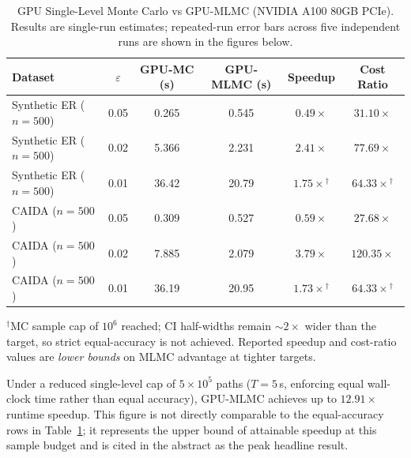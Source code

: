 \documentclass[pdflatex,sn-mathphys-num]{sn-jnl}
\theoremstyle{thmstyleone}%
\theoremstyle{thmstyletwo}%
\theoremstyle{thmstylethree}%
\begin{document}
\begin{table}[t]
\caption{GPU Single-Level Monte Carlo vs GPU-MLMC (NVIDIA A100 80GB PCIe). Results are
single-run estimates; repeated-run error bars across five independent runs are shown in the figures below.}
\label{tab:gpu_gpu_a100}
\centering\small
\begin{tabular*}{\linewidth}{@{\extracolsep\fill}l c c c c c@{}}
\toprule
Dataset & $\varepsilon$ & GPU-MC (s) & GPU-MLMC (s) & Speedup & Cost Ratio \\
\midrule
Synthetic ER ($n=500$) & 0.05 & 0.265 & 0.545 & $0.49\times$ & $31.10\times$ \\
Synthetic ER ($n=500$) & 0.02 & 5.366 & 2.231 & $2.41\times$ & $77.69\times$ \\
Synthetic ER ($n=500$) & 0.01 & 36.42 & 20.79 & $1.75\times$$^\dagger$ & $64.33\times$$^\dagger$ \\
CAIDA ($n=500$) & 0.05 & 0.309 & 0.527 & $0.59\times$ & $27.68\times$ \\
CAIDA ($n=500$) & 0.02 & 7.885 & 2.079 & $3.79\times$ & $120.35\times$ \\
CAIDA ($n=500$) & 0.01 & 36.19 & 20.95 & $1.73\times$$^\dagger$ & $64.33\times$$^\dagger$ \\
\bottomrule
\end{tabular*}
\vspace{2pt}
\footnotesize$^\dagger$MC sample cap of $10^6$ reached; CI half-widths remain ${\sim}2\times$
wider than the target, so strict equal-accuracy is not achieved. Reported speedup and cost-ratio
values are \emph{lower bounds} on MLMC advantage at tighter targets.\normalsize
\end{table}

Under a reduced single-level cap of $5\times10^5$ paths ($T{=}5$\,s, enforcing equal wall-clock
time rather than equal accuracy), GPU-MLMC achieves up to $12.91\times$ runtime speedup.
This figure is not directly comparable to the equal-accuracy rows in
Table~\ref{tab:gpu_gpu_a100}; it represents the upper bound of attainable speedup at this sample
budget and is cited in the abstract as the peak headline result.
\end{document}
